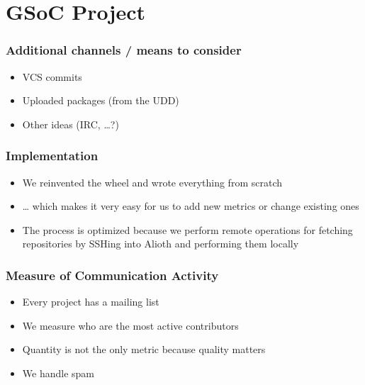 \documentclass[compress]{beamer}
\begin{document}
\section{GSoC Project}

\begin{frame}
  \frametitle{Additional channels / means %
              to consider
             }
  \begin{itemize}
    \item VCS commits
    \item Uploaded packages (from the UDD)
    \item Other ideas (IRC, \dots?)
  \end{itemize}
\end{frame}

\begin{frame}
    \frametitle{Implementation}
    \begin{itemize}
        \item We reinvented the wheel and wrote everything from scratch 
        \item \dots{} which makes it very easy for us to add new metrics or change existing ones
        \pause
        \item The process is optimized because we perform remote operations for fetching repositories by SSHing into Alioth and performing them locally
    \end{itemize}
\end{frame}

\begin{frame}
  \frametitle{Measure of Communication Activity}
  \begin{itemize}
     \item Every project has a mailing list
     \item We measure who are the most active contributors
     \item Quantity is not the only metric because quality matters 
     \item We handle spam
  \end{itemize}
\end{frame}
\end{document}
